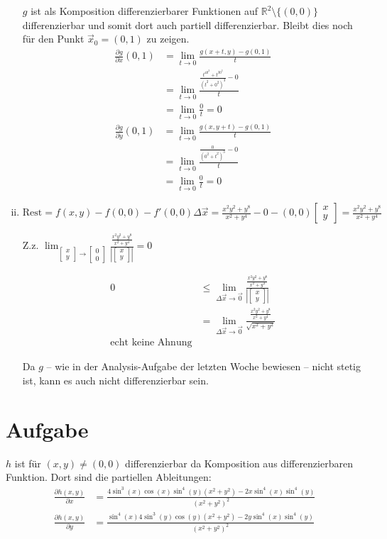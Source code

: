 \documentclass[10pt,a4paper,parskip=half]{scrartcl}
\newcommand{\R}{\mathbb{R}}
\newcommand{\vectwo}[2]{\begin{bmatrix} #1 \\ #2 \end{bmatrix}}
\begin{document}
\begin{enumerate}[(i)]
$g$ ist als Komposition differenzierbarer Funktionen auf $\R^2\setminus{\{(0,0)\}}$ differenzierbar und somit dort auch partiell differenzierbar. Bleibt dies noch für den Punkt $\vec x_0 = (0,1)$ zu zeigen.
\begin{align*}
\frac{\partial g}{\partial x} (0,1)&= \lim_{t \to 0} \frac{g(x+t,y)-g(0,1)}{t}\\
&= \lim_{t \to 0} \frac{\frac{t^40^2+t^30^3}{(t^2+0^2)^3} - 0}{t}\\
&= \lim_{t \to 0} \frac{0}{t} = 0
\end{align*}
\begin{align*}
\frac{\partial g}{\partial y} (0,1)&= \lim_{t \to 0} \frac{g(x,y+t)-g(0,1)}{t}\\
&= \lim_{t \to 0} \frac{\frac{0}{(0^2+t^2)^3} - 0}{t}\\
&= \lim_{t \to 0} \frac{0}{t} = 0
\end{align*}

\item
$\textrm{Rest} = f(x,y) - f(0,0) - f'(0,0) \Delta \vec x = \frac{x^2y^2+y^8}{x^2 + y^4} - 0 - (0,0) \vectwo{x}{y} = \frac{x^2y^2+y^8}{x^2 + y^4}$

Z.z. $\lim_{\vectwo{x}{y} \to \vectwo{0}{0}} \frac{\frac{x^2y^2+y^8}{x^2 + y^4}}{\left|\vectwo{x}{y}\right|} = 0$

\begin{align*}
0 &\le \lim_{\Delta \vec x \to \vec 0} \frac{\frac{x^2y^2+y^8}{x^2 + y^4}}{\left|\vectwo{x}{y}\right|}\\
&= \lim_{\Delta \vec x \to \vec 0} \frac{\frac{x^2y^2+y^8}{x^2 + y^4}}{\sqrt{x^2+y^2}} \\ 
\textrm{echt keine Ahnung}
\end{align*}

Da $g$ -- wie in der Analysis-Aufgabe der letzten Woche bewiesen -- nicht stetig ist, kann es auch nicht differenzierbar sein.
\end{enumerate}
\section{Aufgabe}
$h$ ist für $(x,y) \neq (0,0)$ differenzierbar da Komposition aus differenzierbaren Funktion. Dort sind die partiellen Ableitungen:
\begin{align*}
\frac{\partial h(x,y)}{\partial x} &= \frac{4\sin^3(x)\cos(x)\sin^4(y) (x^2 + y^2) - 2x\sin^4(x)\sin^4(y)}{(x^2 + y^2)^2} \\
\frac{\partial h(x,y)}{\partial y} &= \frac{\sin^4(x)4\sin^3(y)\cos(y) (x^2 + y^2) - 2y\sin^4(x)\sin^4(y)}{(x^2 + y^2)^2}
\end{align*}
\end{document}
